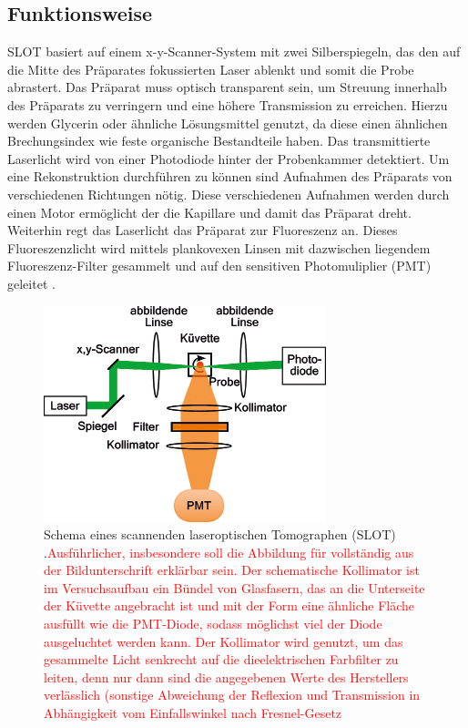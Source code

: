 \subsection{Funktionsweise}
SLOT basiert auf einem x-y-Scanner-System mit zwei Silberspiegeln, das den auf die Mitte des Präparates fokussierten Laser ablenkt und somit die Probe abrastert. Das Präparat muss optisch transparent sein, um Streuung innerhalb des Präparats zu verringern und eine höhere Transmission zu erreichen. Hierzu werden Glycerin oder ähnliche Lösungsmittel genutzt, da diese einen ähnlichen Brechungsindex wie feste organische Bestandteile haben. Das transmittierte Laserlicht wird von einer Photodiode hinter der Probenkammer detektiert. Um eine Rekonstruktion durchführen zu können sind Aufnahmen des Präparats von verschiedenen Richtungen nötig. Diese verschiedenen Aufnahmen werden durch einen Motor ermöglicht der die Kapillare und damit das Präparat dreht. Weiterhin regt das Laserlicht das Präparat zur Fluoreszenz an. Dieses Fluoreszenzlicht wird mittels plankovexen Linsen mit dazwischen liegendem Fluoreszenz-Filter gesammelt und auf den sensitiven Photomuliplier (PMT) geleitet \cite{Anleitung}.\\

\begin{figure}
	\centering
\includegraphics[width=0.8\linewidth]{IMAGE/slot_schema.png}
	\caption{Schema eines scannenden laseroptischen Tomographen (SLOT) \cite{slot_paper}.\textcolor{red}{Ausführlicher, insbesondere soll die Abbildung für vollständig aus der Bildunterschrift erklärbar sein. Der schematische Kollimator ist im Versuchsaufbau ein Bündel von Glasfasern, das an die Unterseite der Küvette angebracht ist und mit der Form eine ähnliche Fläche ausfüllt wie die PMT-Diode, sodass möglichst viel der Diode ausgeluchtet werden kann. Der Kollimator wird genutzt, um das gesammelte Licht senkrecht auf die dieelektrischen Farbfilter zu leiten, denn nur dann sind die angegebenen Werte des Herstellers verlässlich (sonstige Abweichung der Reflexion und Transmission in Abhängigkeit vom Einfallswinkel nach Fresnel-Gesetz}}
	\label{fig:schema}
\end{figure} 

